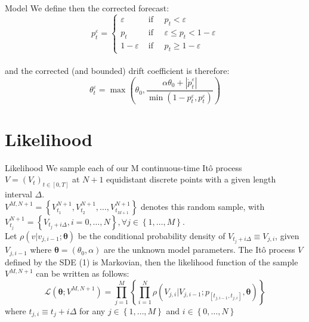 \documentclass{beamer}
\begin{document}
\begin{frame}{Model}
We define then the corrected forecast:
$$
p_{t}^{\varepsilon}=\left\{\begin{array}{ll}
\varepsilon & \text { if } \quad p_{t}<\varepsilon \\
p_{t} & \text { if } \quad \varepsilon \leq p_{t}<1-\varepsilon \\
1-\varepsilon & \text { if } \quad p_{t} \geq 1-\varepsilon
\end{array}\right.
$$\\
and the corrected (and bounded) drift coefficient is therefore:
$$
\theta_{t}^{\varepsilon}=\max \left(\theta_{0}, \frac{\alpha \theta_{0}+\left|\dot{p}_{t}^{\varepsilon}\right|}{ \min \left(1-p_{t}^{\varepsilon}, p_{t}^{\varepsilon}\right)}\right)
$$
\end{frame}

\section{Likelihood}

\begin{frame}{Likelihood}
\justifying
We sample each of our M continuous-time Itô process $V=(V_{t})_{t \in[0, T]}$  at $N+1$ equidistant discrete points with a given length interval $\Delta$.
\\ $V^{M, N+1}=\left\{V_{t_{1}}^{N+1}, V_{t_{2}}^{N+1}, \ldots, V_{t_{M+1}}^{N+1}\right\}$ denotes this random sample, with $V_{t_{j}}^{N+1}=\left\{V_{t_{j}+i \Delta}, i=0, \ldots, N\right\}, \forall j\in\left\{1, \ldots, M\right\}.$
\vskip 0.5cm
\\Let $\rho\left(v | v_{j, i-1} ; \boldsymbol{\theta}\right)$ be the conditional probability density of $V_{t_{j}+i \Delta} \equiv V_{j, i}$,  given $V_{j, i-1}$  where $\boldsymbol{\theta}=\left(\theta_{0}, \alpha\right)$ are the unknown model parameters.
\vskip 0.5cm
The Itô process $V$ defined by the SDE (1) is Markovian, then the likelihood function of the sample $V^{M, N+1}$ can be written as follows:
\[
\mathcal{L}\left(\boldsymbol{\theta} ; V^{M, N+1}\right)=\prod_{j=1}^{M}\left\{\prod_{i=1}^{N} \rho\left(V_{j, i} | V_{j, i-1} ; p_{\left[t_{j, i-1}, t_{j, i}\right]}, \boldsymbol{\theta}\right)\right\}
\]
where $t_{j, i} \equiv t_{j}+i \Delta$ for any $j\in\left\{1, \ldots, M\right\}$ and $i\in\left\{0, \ldots, N\right\}$
\end{frame}
\end{document}
